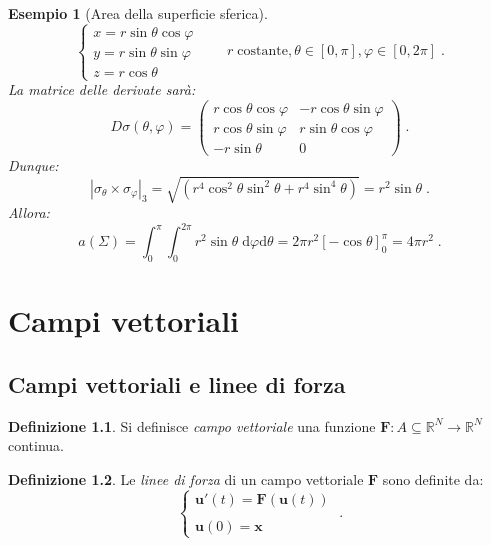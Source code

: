 \documentclass[a4paper,12pt]{report}
\theoremstyle{plain}
\newtheorem{exm}{Esempio}[section]
\theoremstyle{definition}
\newtheorem{defn}{Definizione}[section]
\theoremstyle{remark}
\newcommand{\diff}[1]{\mathrm{d}#1}
\numberwithin{equation}{section}
\begin{document}
\begin{exm}[Area della superficie sferica] 
\begin{equation}
\begin{cases}
 x=r\sin\theta\cos\varphi \\
y=r\sin\theta\sin\varphi \\
z=r\cos\theta
\end{cases}
\qquad r\;\mathrm{costante},\theta\in[0,\pi],\varphi\in[0,2\pi]\;.
\end{equation}
La matrice delle derivate sarà:
\begin{equation}
D\sigma(\theta,\varphi)=\left(\begin{matrix}
                               r\cos\theta\cos\varphi & -r\cos\theta\sin\varphi \\
r\cos\theta\sin\varphi & r\sin\theta\cos\varphi \\
-r\sin\theta & 0
                              \end{matrix}\right)\;.
\end{equation}
Dunque:
\begin{equation}
|\sigma_{\theta}\times\sigma_{\varphi}|_3=\sqrt{(r^4\cos^2\theta\sin^2\theta+r^4\sin^4\theta)}=r^2\sin\theta\;.
\end{equation}
Allora:
\begin{equation}
a(\Sigma)=\int_0^{\pi}\int_0^{2\pi} r^2\sin\theta\;\diff{\varphi} \diff{\theta}=2\pi r^2[-\cos\theta]^{\pi}_0=4\pi r^2\;.
\end{equation}
\end{exm}
\chapter{Campi vettoriali}
\section{Campi vettoriali e linee di forza}
\begin{defn} Si definisce \textit{campo vettoriale} una funzione $\mathbf{F}:A\subseteq\mathbb{R}^N\to\mathbb{R}^N$ continua.
\end{defn}
\begin{defn} Le \textit{linee di forza} di un campo vettoriale $\mathbf{F}$ sono definite da:
\begin{equation}
\begin{cases}
 \mathbf{u}'(t)=\mathbf{F}(\mathbf{u}(t)) \\
\\
\mathbf{u}(0)=\mathbf{x}
\end{cases}\;.
\end{equation}
\end{defn}
\end{document}
